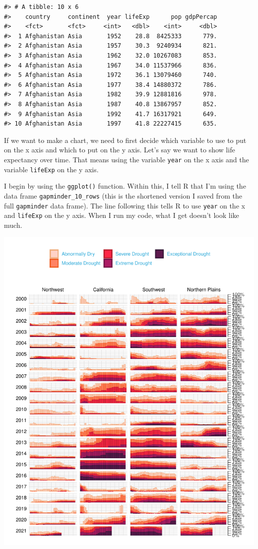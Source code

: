 \documentclass[
]{book}
\begin{document}
\begin{verbatim}
#> # A tibble: 10 x 6
#>    country     continent  year lifeExp      pop gdpPercap
#>    <fct>       <fct>     <int>   <dbl>    <int>     <dbl>
#>  1 Afghanistan Asia       1952    28.8  8425333      779.
#>  2 Afghanistan Asia       1957    30.3  9240934      821.
#>  3 Afghanistan Asia       1962    32.0 10267083      853.
#>  4 Afghanistan Asia       1967    34.0 11537966      836.
#>  5 Afghanistan Asia       1972    36.1 13079460      740.
#>  6 Afghanistan Asia       1977    38.4 14880372      786.
#>  7 Afghanistan Asia       1982    39.9 12881816      978.
#>  8 Afghanistan Asia       1987    40.8 13867957      852.
#>  9 Afghanistan Asia       1992    41.7 16317921      649.
#> 10 Afghanistan Asia       1997    41.8 22227415      635.
\end{verbatim}

If we want to make a chart, we need to first decide which variable to use to put on the x axis and which to put on the y axis. Let's say we want to show life expectancy over time. That means using the variable \texttt{year} on the x axis and the variable \texttt{lifeExp} on the y axis.

I begin by using the \texttt{ggplot()} function. Within this, I tell R that I'm using the data frame \texttt{gapminder\_10\_rows} (this is the shortened version I saved from the full \texttt{gapminder} data frame). The line following this tells R to use \texttt{year} on the x and \texttt{lifeExp} on the y axis. When I run my code, what I get doesn't look like much.

\includegraphics{data-viz_files/figure-latex/unnamed-chunk-4-1.pdf}
\end{document}
